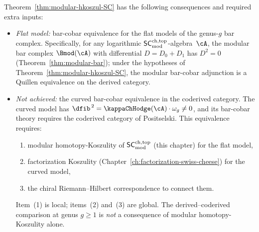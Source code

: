 \begin{remark}
\label{rem:modular-hkoszul-range}
Theorem~\ref{thm:modular-hkoszul-SC} has the following
consequences and required extra inputs:
\begin{itemize}
\item \emph{Flat model:} bar-cobar equivalence for the flat
 models of the genus-$g$ bar complex. Specifically, for any logarithmic
 $\mathsf{SC}^{\mathrm{ch,top}}_{\mathrm{mod}}$-algebra~$\cA$, the modular bar complex $\Bmod(\cA)$ with
 differential $D = D_0 + D_1$ has $D^2 = 0$
 (Theorem~\ref{thm:modular-bar}); under the hypotheses of
 Theorem~\ref{thm:modular-hkoszul-SC}, the modular bar-cobar
 adjunction is a Quillen equivalence on the derived category.

\item \emph{Not achieved:} the curved bar-cobar equivalence in the
 coderived category. The curved model has
 $\dfib^{\,2} = \kappaChHodge(\cA) \cdot \omega_g \neq 0$, and its
 bar-cobar theory requires the coderived category of Positselski.
 This equivalence requires:
 \begin{enumerate}[label=\textup{(\arabic*)}]
 \item modular homotopy-Koszulity of $\mathsf{SC}^{\mathrm{ch,top}}_{\mathrm{mod}}$ (this chapter)
 for the flat model,
 \item factorization Koszulity
 (Chapter~\ref{ch:factorization-swiss-cheese}) for the curved
 model,
 \item the chiral Riemann--Hilbert correspondence to connect them.
 \end{enumerate}
 Item~(1) is local; items~(2) and~(3) are global. The
 derived--coderived comparison at genus $g \ge 1$ is \emph{not}
 a consequence of modular homotopy-Koszulity alone.
\end{itemize}
\end{remark}

